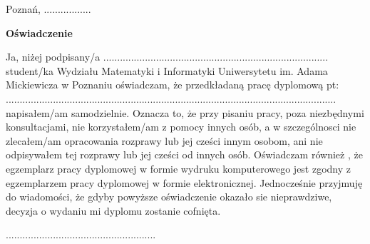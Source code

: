 \thispagestyle{empty}

\begin{flushright}
Poznań, .................
\end{flushright}
\vskip0.7in
\begin{center}
\large \textbf{Oświadczenie}
\end{center}
\vskip0.3in
Ja, niżej podpisany/a ................................................................................. \\ student/ka Wydziału Matematyki i Informatyki Uniwersytetu im. Adama Mickiewicza w Poznaniu oświadczam, że przedkładaną pracę dyplomową pt: .......................................................................................................................\\ napisałem/am samodzielnie. Oznacza to,
że przy pisaniu pracy, poza niezbędnymi konsultacjami, nie korzystałem/am z pomocy innych osób, a w szczególnosci nie zlecałem/am opracowania rozprawy lub jej cześci innym osobom, ani nie odpisywałem tej rozprawy lub jej cześci od innych osób.
Oświadczam również , że egzemplarz pracy dyplomowej w formie wydruku komputerowego jest zgodny z egzemplarzem pracy dyplomowej w formie elektronicznej. Jednocześnie przyjmuję do wiadomości, że gdyby powyższe oświadczenie okazało sie nieprawdziwe, decyzja o wydaniu mi dyplomu zostanie cofnięta.
\vskip0.7in

\begin{flushright}
......................................................
\end{flushright}
